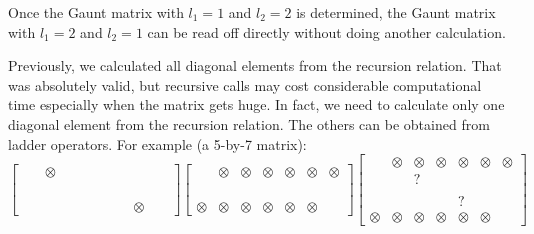 %
Once the Gaunt matrix with $l_1=1$ and $l_2=2$ is determined, the Gaunt
matrix with $l_1=2$ and $l_2=1$ can be read off directly without doing another calculation.

Previously, we calculated all diagonal elements from the recursion relation.
That was absolutely valid, but recursive calls may cost considerable
computational time especially when the matrix gets huge.
In fact, we need to calculate only one diagonal element from the
recursion relation. The others can be obtained from ladder operators.
For example (a 5-by-7 matrix):
\begin{equation*}
\begin{bmatrix}
  & \otimes &  &  &  &  & \\
  &  &  &  &  &  & \\
  &  &  &  &  &  & \\
  &  &  &  &  &  & \\
  \phantom{\otimes} & \phantom{\otimes} & \phantom{\otimes} & \phantom{\otimes} & \phantom{\otimes} & \otimes & \phantom{\otimes}
\end{bmatrix}
\begin{bmatrix}
   & \otimes & \otimes & \otimes & \otimes & \otimes & \otimes \\
   &  &  &  &  &  & \\
   &  &  &  &  &  & \\
   &  &  &  &  &  & \\
  \otimes & \otimes & \otimes & \otimes & \otimes & \otimes & 
\end{bmatrix}
\begin{bmatrix}
   & \boxed{\otimes} & \boxed{\otimes} & \otimes & \otimes & \otimes & \otimes \\
   &  & \boxed{?} &  &  &  & \\
   &  &  &  &  &  & \\
   &  &  &  & ? &  & \\
  \otimes & \otimes & \otimes & \otimes & \otimes & \otimes & 
\end{bmatrix}
\end{equation*}
